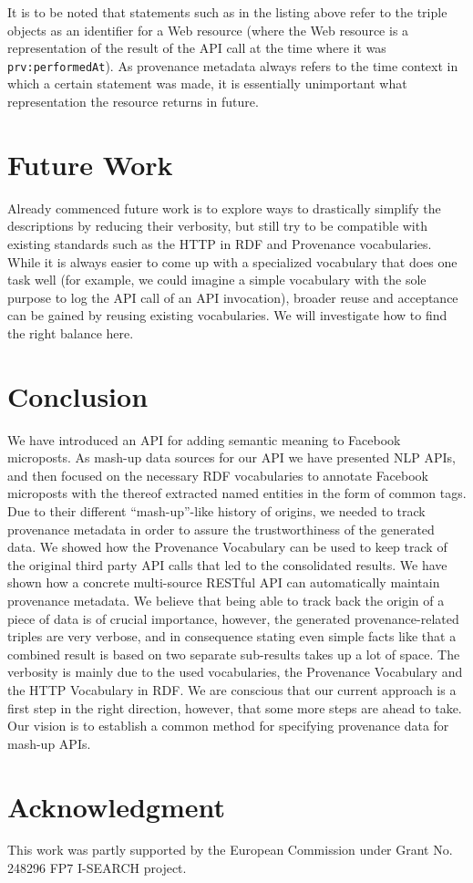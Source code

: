 \documentclass[conference]{IEEEtran}
\begin{document}
It is to be noted that statements such as in the listing above refer to the triple objects as an identifier for a Web resource (where the Web resource is a representation of the result of the API call at the time where it was \texttt{prv:performedAt}). As provenance metadata always refers to the time context in which a certain statement was made, it is essentially unimportant what representation the resource returns in future.

\section{Future Work} \label{sec:future}
Already commenced future work is to explore ways to drastically simplify the descriptions by reducing their verbosity, but still try to be compatible with existing standards such as the HTTP in RDF and Provenance vocabularies. While it is always easier to come up with a specialized vocabulary that does one task well (for example, we could imagine a simple vocabulary with the sole purpose to log the API call of an API invocation), broader reuse and acceptance can be gained by reusing existing vocabularies. We will investigate how to find the right balance here.

\section{Conclusion}                                                        \label{sec:conclusion}
We have introduced an API for adding semantic meaning to Facebook microposts. As mash-up data sources for our API we have presented NLP APIs, and then focused on the necessary RDF vocabularies to annotate Facebook microposts with the thereof extracted named entities in the form of common tags. Due to their different ``mash-up''-like history of origins, we needed to track provenance metadata in order to assure the trustworthiness of the generated data. We showed how the Provenance Vocabulary can be used to keep track of the original third party API calls that led to the consolidated results. We have shown how a concrete multi-source RESTful API can automatically maintain provenance metadata. We believe that being able to track back the origin of a piece of data is of crucial importance, however, the generated provenance-related triples are very verbose, and in consequence stating even simple facts like that a combined result is based on two separate sub-results takes up a lot of space. The verbosity is mainly due to the used vocabularies, the Provenance Vocabulary and the HTTP Vocabulary in RDF. We are conscious that our current approach is a first step in the right direction, however, that some more steps are ahead to take. Our vision is to establish a common method for specifying provenance data for mash-up APIs.

\section*{Acknowledgment}

This work was partly supported by the European Commission under Grant No. 248296 FP7 I-SEARCH project.



\end{document}
